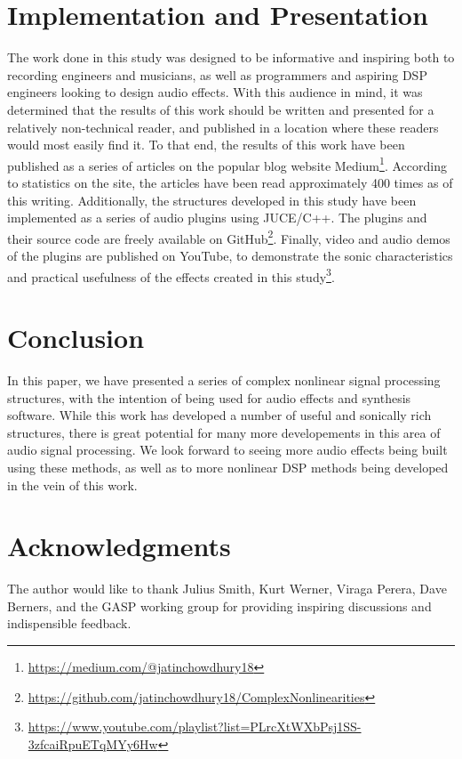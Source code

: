 \documentclass[twoside,a4paper]{article}
\begin{document}
\section{Implementation and Presentation} \label{sec:pres}
%
The work done in this study was designed to be informative and inspiring
both to recording engineers and musicians, as well as programmers and
aspiring DSP engineers looking to design audio effects. With this audience
in mind, it was determined that the results of this work should be written
and presented for a relatively non-technical reader, and published in a
location where these readers would most easily find it. To that end, the
results of this work have been published as a series of articles on the
popular blog website Medium\footnote{\url{https://medium.com/@jatinchowdhury18}}.
According to statistics on the site, the articles have been read approximately
400 times as of this writing. Additionally, the structures developed
in this study have been implemented as a series of audio plugins using JUCE/C++.
The plugins and their source code are freely available on
GitHub\footnote{\url{https://github.com/jatinchowdhury18/ComplexNonlinearities}}.
Finally, video and audio demos of the plugins are published on YouTube, to
demonstrate the sonic characteristics and practical usefulness of the
effects created in this study\footnote{\url{https://www.youtube.com/playlist?list=PLrcXtWXbPsj1SS-3zfcaiRpuETqMYy6Hw}}.

\section{Conclusion} \label{sec:conclusion}
%
In this paper, we have presented a series of complex nonlinear signal
processing structures, with the intention of being used for audio effects
and synthesis software. While this work has developed a number of useful
and sonically rich structures, there is great potential for many more
developements in this area of audio signal processing. We look forward
to seeing more audio effects being built using these methods, as well as to
more nonlinear DSP methods being developed in the vein of this work.

\section{Acknowledgments}
%
The author would like to thank Julius Smith, Kurt Werner, Viraga Perera,
Dave Berners, and the GASP working group for providing inspiring discussions
and indispensible feedback.

\nocite{*}


\end{document}
